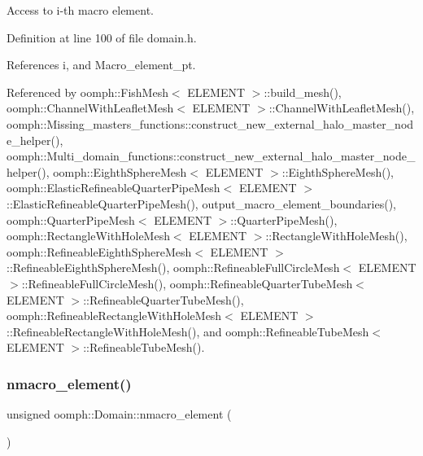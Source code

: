 Access to i-\/th macro element. 



Definition at line 100 of file domain.\+h.



References i, and Macro\+\_\+element\+\_\+pt.



Referenced by oomph\+::\+Fish\+Mesh$<$ E\+L\+E\+M\+E\+N\+T $>$\+::build\+\_\+mesh(), oomph\+::\+Channel\+With\+Leaflet\+Mesh$<$ E\+L\+E\+M\+E\+N\+T $>$\+::\+Channel\+With\+Leaflet\+Mesh(), oomph\+::\+Missing\+\_\+masters\+\_\+functions\+::construct\+\_\+new\+\_\+external\+\_\+halo\+\_\+master\+\_\+node\+\_\+helper(), oomph\+::\+Multi\+\_\+domain\+\_\+functions\+::construct\+\_\+new\+\_\+external\+\_\+halo\+\_\+master\+\_\+node\+\_\+helper(), oomph\+::\+Eighth\+Sphere\+Mesh$<$ E\+L\+E\+M\+E\+N\+T $>$\+::\+Eighth\+Sphere\+Mesh(), oomph\+::\+Elastic\+Refineable\+Quarter\+Pipe\+Mesh$<$ E\+L\+E\+M\+E\+N\+T $>$\+::\+Elastic\+Refineable\+Quarter\+Pipe\+Mesh(), output\+\_\+macro\+\_\+element\+\_\+boundaries(), oomph\+::\+Quarter\+Pipe\+Mesh$<$ E\+L\+E\+M\+E\+N\+T $>$\+::\+Quarter\+Pipe\+Mesh(), oomph\+::\+Rectangle\+With\+Hole\+Mesh$<$ E\+L\+E\+M\+E\+N\+T $>$\+::\+Rectangle\+With\+Hole\+Mesh(), oomph\+::\+Refineable\+Eighth\+Sphere\+Mesh$<$ E\+L\+E\+M\+E\+N\+T $>$\+::\+Refineable\+Eighth\+Sphere\+Mesh(), oomph\+::\+Refineable\+Full\+Circle\+Mesh$<$ E\+L\+E\+M\+E\+N\+T $>$\+::\+Refineable\+Full\+Circle\+Mesh(), oomph\+::\+Refineable\+Quarter\+Tube\+Mesh$<$ E\+L\+E\+M\+E\+N\+T $>$\+::\+Refineable\+Quarter\+Tube\+Mesh(), oomph\+::\+Refineable\+Rectangle\+With\+Hole\+Mesh$<$ E\+L\+E\+M\+E\+N\+T $>$\+::\+Refineable\+Rectangle\+With\+Hole\+Mesh(), and oomph\+::\+Refineable\+Tube\+Mesh$<$ E\+L\+E\+M\+E\+N\+T $>$\+::\+Refineable\+Tube\+Mesh().

\mbox{\label{classoomph_1_1Domain_a3ed63583615d0e8471d95ba13ccc0aff}} 
\subsubsection{\texorpdfstring{nmacro\+\_\+element()}{nmacro\_element()}}
{\footnotesize\ttfamily unsigned oomph\+::\+Domain\+::nmacro\+\_\+element (\begin{DoxyParamCaption}{ }\end{DoxyParamCaption})\hspace{0.3cm}{\ttfamily [inline]}}



